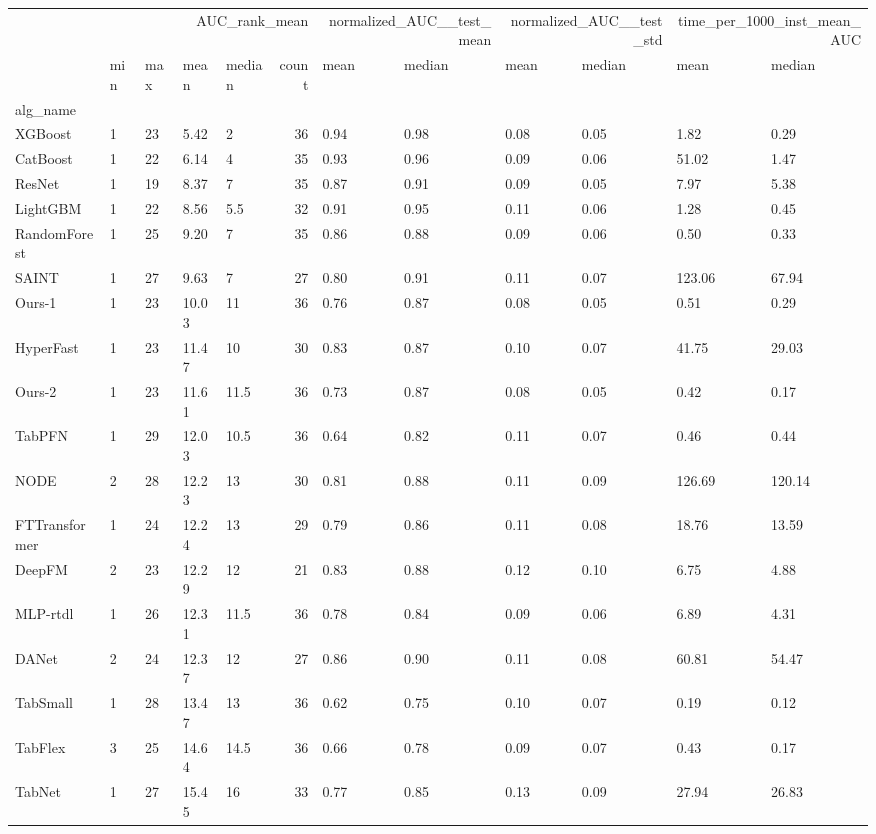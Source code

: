 \begin{tabular}{lllllrllllll}
\toprule
 & \multicolumn{5}{r}{AUC_rank_mean} & \multicolumn{2}{r}{normalized_AUC__test_mean} & \multicolumn{2}{r}{normalized_AUC__test_std} & \multicolumn{2}{r}{time_per_1000_inst_mean_AUC} \\
 & min & max & mean & median & count & mean & median & mean & median & mean & median \\
alg_name &  &  &  &  &  &  &  &  &  &  &  \\
\midrule
XGBoost & 1 & 23 & 5.42 & 2 & 36 & 0.94 & 0.98 & 0.08 & 0.05 & 1.82 & 0.29 \\
CatBoost & 1 & 22 & 6.14 & 4 & 35 & 0.93 & 0.96 & 0.09 & 0.06 & 51.02 & 1.47 \\
ResNet & 1 & 19 & 8.37 & 7 & 35 & 0.87 & 0.91 & 0.09 & 0.05 & 7.97 & 5.38 \\
LightGBM & 1 & 22 & 8.56 & 5.5 & 32 & 0.91 & 0.95 & 0.11 & 0.06 & 1.28 & 0.45 \\
RandomForest & 1 & 25 & 9.20 & 7 & 35 & 0.86 & 0.88 & 0.09 & 0.06 & 0.50 & 0.33 \\
SAINT & 1 & 27 & 9.63 & 7 & 27 & 0.80 & 0.91 & 0.11 & 0.07 & 123.06 & 67.94 \\
Ours-1 & 1 & 23 & 10.03 & 11 & 36 & 0.76 & 0.87 & 0.08 & 0.05 & 0.51 & 0.29 \\
HyperFast & 1 & 23 & 11.47 & 10 & 30 & 0.83 & 0.87 & 0.10 & 0.07 & 41.75 & 29.03 \\
Ours-2 & 1 & 23 & 11.61 & 11.5 & 36 & 0.73 & 0.87 & 0.08 & 0.05 & 0.42 & 0.17 \\
TabPFN & 1 & 29 & 12.03 & 10.5 & 36 & 0.64 & 0.82 & 0.11 & 0.07 & 0.46 & 0.44 \\
NODE & 2 & 28 & 12.23 & 13 & 30 & 0.81 & 0.88 & 0.11 & 0.09 & 126.69 & 120.14 \\
FTTransformer & 1 & 24 & 12.24 & 13 & 29 & 0.79 & 0.86 & 0.11 & 0.08 & 18.76 & 13.59 \\
DeepFM & 2 & 23 & 12.29 & 12 & 21 & 0.83 & 0.88 & 0.12 & 0.10 & 6.75 & 4.88 \\
MLP-rtdl & 1 & 26 & 12.31 & 11.5 & 36 & 0.78 & 0.84 & 0.09 & 0.06 & 6.89 & 4.31 \\
DANet & 2 & 24 & 12.37 & 12 & 27 & 0.86 & 0.90 & 0.11 & 0.08 & 60.81 & 54.47 \\
TabSmall & 1 & 28 & 13.47 & 13 & 36 & 0.62 & 0.75 & 0.10 & 0.07 & 0.19 & 0.12 \\
TabFlex & 3 & 25 & 14.64 & 14.5 & 36 & 0.66 & 0.78 & 0.09 & 0.07 & 0.43 & 0.17 \\
TabNet & 1 & 27 & 15.45 & 16 & 33 & 0.77 & 0.85 & 0.13 & 0.09 & 27.94 & 26.83 \\

\end{tabular}
